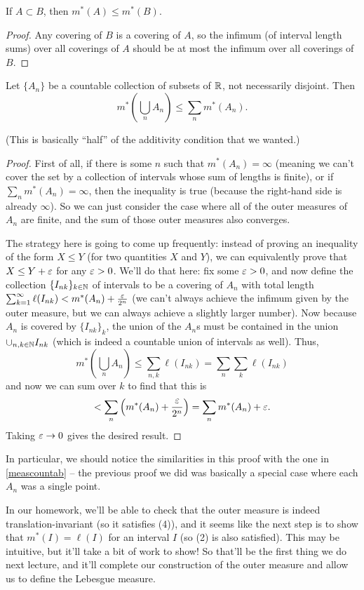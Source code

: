 \begin{lemma}
If $A \subset B$, then $m^\ast(A) \le m^\ast(B)$.
\end{lemma}
\begin{proof}
Any covering of $B$ is a covering of $A$, so the infimum (of interval length sums) over all coverings of $A$ should be at most the infimum over all coverings of $B$. 
\end{proof}

\begin{theorem}
Let $\{A_n\}$ be a countable collection of subsets of $\mathbb R$, not necessarily disjoint. Then 
\[
    m^\ast\left(\bigcup_n A_n \right) \le \sum_n m^\ast(A_n).
\]  
\end{theorem}

(This is basically ``half'' of the additivity condition that we wanted.)

\begin{proof}
First of all, if there is some $n$ such that $m^\ast(A_n) = \infty$ (meaning we can't cover the set by a collection of intervals whose sum of lengths is finite), or if $\sum_n m^\ast(A_n) = \infty$, then the inequality is true (because the right-hand side is already $\infty$). So we can just consider the case where all of the outer measures of $A_n$ are finite, and the sum of those outer measures also converges. 

The strategy here is going to come up frequently: instead of proving an inequality of the form $X \le Y$ (for two quantities $X$ and $Y$), we can equivalently prove that $ X \le Y + \varepsilon$ for any $\varepsilon > 0$. We'll do that here: fix some $\varepsilon > 0$, and now define the collection $\{I_{nk}\}_{k \in \mathbb N}$ of intervals to be a covering of $A_n$ with total length $\sum_{k=1}^{\infty} \ell(I_{nk}) < m^\ast(A_n) + \frac{\varepsilon}{2^n}$ (we can't always achieve the infimum given by the outer measure, but we can always achieve a slightly larger number). Now because $A_n$ is covered by $\{I_{nk}\}_k$, the union of the $A_n$s must be contained in the union $\cup_{n, k \in \mathbb N} I_{nk}$ (which is indeed a countable union of intervals as well). Thus, 
\[
    m^\ast\left(\bigcup_{n} A_n\right) \le \sum_{n,k} \ell(I_{nk}) = \sum_n \sum_k \ell(I_{nk})
\]
and now we can sum over $k$ to find that this is
\[
    < \sum_n \left(m^\ast(A_n) + \frac{\varepsilon}{2^n}\right) = \sum_n m^\ast(A_n) + \varepsilon.
\]
Taking $\varepsilon \to 0$ gives the desired result.
\end{proof}

In particular, we should notice the similarities in this proof with the one in \cref{meascountab} -- the previous proof we did was basically a special case where each $A_n$ was a single point.

In our homework, we'll be able to check that the outer measure is indeed translation-invariant (so it satisfies (4)), and it seems like the next step is to show that $m^\ast(I) = \ell(I)$ for an interval $I$ (so (2) is also satisfied). This may be intuitive, but it'll take a bit of work to show! So that'll be the first thing we do next lecture, and it'll complete our construction of the outer measure and allow us to define the Lebesgue measure.